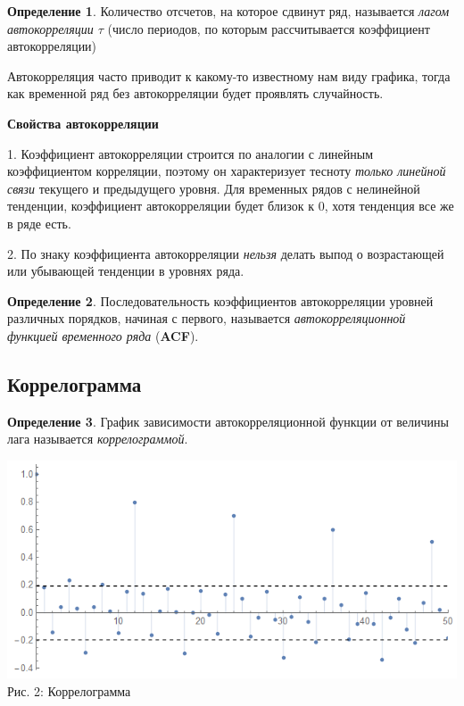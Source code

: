 \documentclass[aps,%
12pt,%
final,%
oneside,
onecolumn,%
musixtex, %
superscriptaddress,%
centertags]{article} %
\theoremstyle{plain}
\theoremstyle{definition}
\newtheorem{definition}{Определение}[subsection]
\theoremstyle{remark}
\begin{document}
\begin{definition}
	Количество отсчетов, на которое сдвинут ряд, называется \textit{лагом автокорреляции $\tau$} (число периодов, по которым рассчитывается коэффициент автокорреляции)
\end{definition}

Автокорреляция часто приводит к какому-то известному нам виду графика, тогда как временной ряд без автокорреляции будет проявлять случайность.

\textbf{Свойства автокорреляции}

1. Коэффициент автокорреляции строится по аналогии с линейным коэффициентом корреляции, поэтому он характеризует тесноту \textit{только линейной связи} текущего и предыдущего уровня. Для временных рядов с нелинейной тенденции, коэффициент автокорреляции будет близок к $0$, хотя тенденция все же в ряде есть.

2. По знаку коэффициента автокорреляции \textit{нельзя} делать выпод о возрастающей или убывающей тенденции в уровнях ряда.

\begin{definition}
	Последовательность коэффициентов автокорреляции уровней различных порядков, начиная с первого, называется \textit{автокорреляционной функцией временного ряда} (\textbf{ACF}).
\end{definition}

\newpage
\subsection{Коррелограмма}

\begin{definition}
	График зависимости автокорреляционной функции от величины лага называется \textit{коррелограммой}.
\end{definition}

\begin{center}
	\includegraphics[scale=0.6]{images/2.png}
	Рис. 2: Коррелограмма
\end{center}
\end{document}
